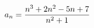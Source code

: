 \documentclass[preview]{standalone}
\begin{document}
\begin{align*}
\special{dvisvgm:raw <g id='unique000'>}a_n=\frac{n^3+2n^2-5n+7}{n^2+1}\special{dvisvgm:raw </g>}
\end{align*}
\end{document}
